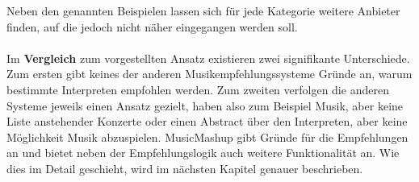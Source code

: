 Neben den genannten Beispielen lassen sich für jede Kategorie weitere Anbieter finden, auf die jedoch nicht näher eingegangen werden soll.

\paragraph{} Im \textbf{Vergleich} zum vorgestellten Ansatz existieren zwei signifikante Unterschiede. Zum ersten gibt keines der anderen Musikempfehlungssysteme Gründe an, warum bestimmte Interpreten empfohlen werden. Zum zweiten verfolgen die anderen Systeme jeweils einen Ansatz gezielt, haben also zum Beispiel Musik, aber keine Liste anstehender Konzerte oder einen Abstract über den Interpreten, aber keine Möglichkeit Musik abzuspielen. MusicMashup gibt Gründe für die Empfehlungen an und bietet neben der Empfehlungslogik auch weitere Funktionalität an. Wie dies im Detail geschieht, wird im nächsten Kapitel genauer beschrieben.